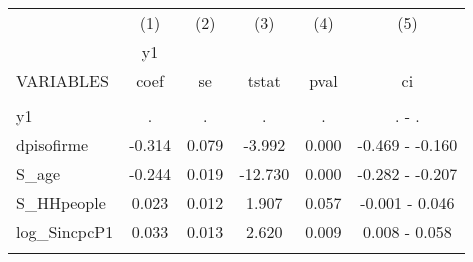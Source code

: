 \documentclass[]{article}
\begin{document}
\begin{tabular}{lccccc} \hline
 & (1) & (2) & (3) & (4) & (5) \\
 & y1 &  &  &  &  \\
VARIABLES & coef & se & tstat & pval & ci \\ \hline
 &  &  &  &  &  \\
y1 & . & . & . & . & . - . \\
dpisofirme & -0.314 & 0.079 & -3.992 & 0.000 & -0.469 - -0.160 \\
S\_age & -0.244 & 0.019 & -12.730 & 0.000 & -0.282 - -0.207 \\
S\_HHpeople & 0.023 & 0.012 & 1.907 & 0.057 & -0.001 - 0.046 \\
log\_SincpcP1 & 0.033 & 0.013 & 2.620 & 0.009 & 0.008 - 0.058 \\
 &  &  &  &  &  \\ \hline
\end{tabular}
\end{document}
